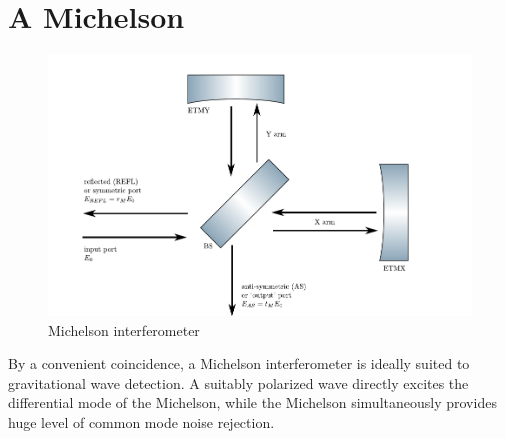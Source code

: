 \section{A Michelson}
\begin{figure}
\includegraphics{figures/michelson.pdf}
\caption[Michelson interferometer]{\label{fig:michelson}Michelson interferometer}
\end{figure}

By a convenient coincidence, a Michelson interferometer is ideally
suited to gravitational wave detection.  A suitably polarized wave
directly excites the differential mode of the Michelson, while the
Michelson simultaneously provides huge level of common mode noise
rejection.

